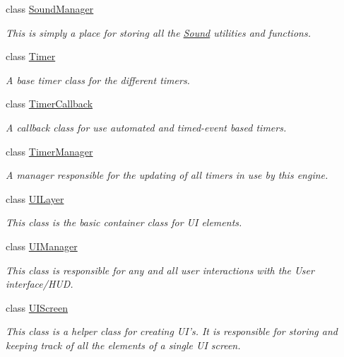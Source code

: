 \begin{DoxyCompactItemize}
class \hyperlink{classphys_1_1SoundManager}{SoundManager}
\begin{DoxyCompactList}\small\item\em This is simply a place for storing all the \hyperlink{classphys_1_1Sound}{Sound} utilities and functions. \item\end{DoxyCompactList}\item 
class \hyperlink{classphys_1_1Timer}{Timer}
\begin{DoxyCompactList}\small\item\em A base timer class for the different timers. \item\end{DoxyCompactList}\item 
class \hyperlink{classphys_1_1TimerCallback}{TimerCallback}
\begin{DoxyCompactList}\small\item\em A callback class for use automated and timed-\/event based timers. \item\end{DoxyCompactList}\item 
class \hyperlink{classphys_1_1TimerManager}{TimerManager}
\begin{DoxyCompactList}\small\item\em A manager responsible for the updating of all timers in use by this engine. \item\end{DoxyCompactList}\item 
class \hyperlink{classphys_1_1UILayer}{UILayer}
\begin{DoxyCompactList}\small\item\em This class is the basic container class for UI elements. \item\end{DoxyCompactList}\item 
class \hyperlink{classphys_1_1UIManager}{UIManager}
\begin{DoxyCompactList}\small\item\em This class is responsible for any and all user interactions with the User interface/HUD. \item\end{DoxyCompactList}\item 
class \hyperlink{classphys_1_1UIScreen}{UIScreen}
\begin{DoxyCompactList}\small\item\em This class is a helper class for creating UI's. It is responsible for storing and keeping track of all the elements of a single UI screen. \item\end{DoxyCompactList}\item 

\end{DoxyCompactItemize}
